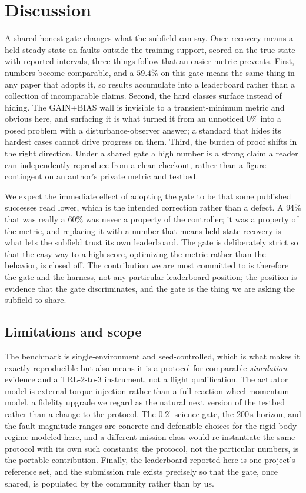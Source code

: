 \documentclass[11pt]{article}
\begin{document}
\section{Discussion}
A shared honest gate changes what the subfield can say. Once recovery means a held steady state on
faults outside the training support, scored on the true state with reported intervals, three things
follow that an easier metric prevents. First, numbers become comparable, and a $59.4\%$ on this gate
means the same thing in any paper that adopts it, so results accumulate into a leaderboard rather than
a collection of incomparable claims. Second, the hard classes surface instead of hiding. The
GAIN+BIAS wall is invisible to a transient-minimum metric and obvious here, and surfacing it is what
turned it from an unnoticed $0\%$ into a posed problem with a disturbance-observer answer; a standard
that hides its hardest cases cannot drive progress on them. Third, the burden of proof shifts in the
right direction. Under a shared gate a high number is a strong claim a reader can independently
reproduce from a clean checkout, rather than a figure contingent on an author's private metric and
testbed.

We expect the immediate effect of adopting the gate to be that some published successes read lower,
which is the intended correction rather than a defect. A $94\%$ that was really a $60\%$ was never a
property of the controller; it was a property of the metric, and replacing it with a number that
means held-state recovery is what lets the subfield trust its own leaderboard. The gate is deliberately
strict so that the easy way to a high score, optimizing the metric rather than the behavior, is closed
off. The contribution we are most committed to is therefore the gate and the harness, not any
particular leaderboard position; the position is evidence that the gate discriminates, and the gate is
the thing we are asking the subfield to share.

\subsection{Limitations and scope} The benchmark is single-environment and seed-controlled, which is
what makes it exactly reproducible but also means it is a protocol for comparable
\emph{simulation} evidence and a TRL-2-to-3 instrument, not a flight qualification. The actuator
model is external-torque injection rather than a full reaction-wheel-momentum model, a fidelity
upgrade we regard as the natural next version of the testbed rather than a change to the protocol. The
$0.2^\circ$ science gate, the $200$\,s horizon, and the fault-magnitude ranges are concrete and
defensible choices for the rigid-body regime modeled here, and a different mission class would
re-instantiate the same protocol with its own such constants; the protocol, not the particular
numbers, is the portable contribution. Finally, the leaderboard reported here is one project's
reference set, and the submission rule exists precisely so that the gate, once shared, is populated by
the community rather than by us.
\end{document}

